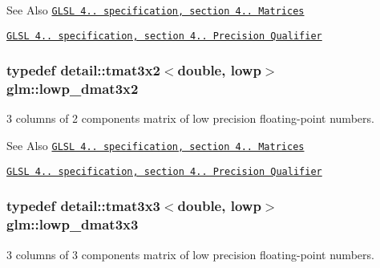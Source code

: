 \begin{DoxySeeAlso}{See Also}
\href{http://www.opengl.org/registry/doc/GLSLangSpec.4.20.8.pdf}{\tt G\-L\-S\-L 4.. specification, section 4.. Matrices} 

\href{http://www.opengl.org/registry/doc/GLSLangSpec.4.20.8.pdf}{\tt G\-L\-S\-L 4.. specification, section 4.. Precision Qualifier} 
\end{DoxySeeAlso}
\hypertarget{group__core__precision_ga678c21e4fadeda255cfb146d40844bdd}{
\subsubsection[{lowp\-\_\-dmat3x2}]{\setlength{\rightskip}{0pt plus 5cm}typedef detail\-::tmat3x2$<$double, lowp$>$ {\bf glm\-::lowp\-\_\-dmat3x2}}}\label{group__core__precision_ga678c21e4fadeda255cfb146d40844bdd}
3 columns of 2 components matrix of low precision floating-\/point numbers.

\begin{DoxySeeAlso}{See Also}
\href{http://www.opengl.org/registry/doc/GLSLangSpec.4.20.8.pdf}{\tt G\-L\-S\-L 4.. specification, section 4.. Matrices} 

\href{http://www.opengl.org/registry/doc/GLSLangSpec.4.20.8.pdf}{\tt G\-L\-S\-L 4.. specification, section 4.. Precision Qualifier} 
\end{DoxySeeAlso}
\hypertarget{group__core__precision_gaea1bc4ede38e1b904f01ff5ce59210ea}{
\subsubsection[{lowp\-\_\-dmat3x3}]{\setlength{\rightskip}{0pt plus 5cm}typedef detail\-::tmat3x3$<$double, lowp$>$ {\bf glm\-::lowp\-\_\-dmat3x3}}}\label{group__core__precision_gaea1bc4ede38e1b904f01ff5ce59210ea}
3 columns of 3 components matrix of low precision floating-\/point numbers.


